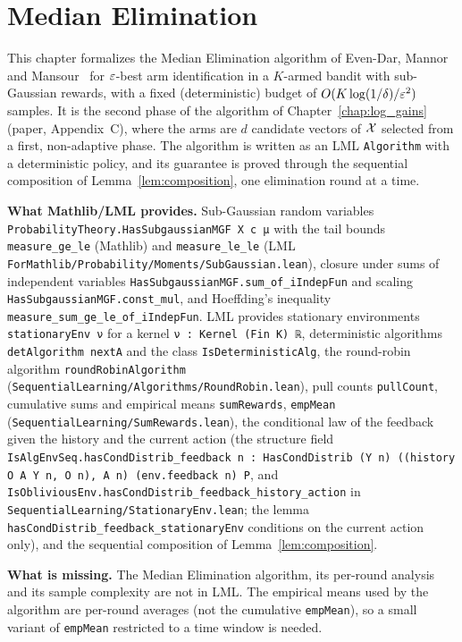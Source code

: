 \chapter{Median Elimination}
\label{chap:pre_median}

This chapter formalizes the Median Elimination algorithm of Even-Dar, Mannor and
Mansour~\cite{even2002pac,evendar2006action} for $\varepsilon$-best arm identification in a
$K$-armed bandit with sub-Gaussian rewards, with a fixed (deterministic) budget of
$O(K\log(1/\delta)/\varepsilon^2)$ samples. It is the second phase of the algorithm of
Chapter~\ref{chap:log_gains} (paper, Appendix~C), where the arms are $d$ candidate vectors of
$\mathcal{X}$ selected from a first, non-adaptive phase. The algorithm is written as an LML
\texttt{Algorithm} with a deterministic policy, and its guarantee is proved through the
sequential composition of Lemma~\ref{lem:composition}, one elimination round at a time.

\textbf{What Mathlib/LML provides.} Sub-Gaussian random variables
\texttt{ProbabilityTheory.HasSubgaussianMGF X c μ} with the tail bounds \texttt{measure\_ge\_le}
(Mathlib) and \texttt{measure\_le\_le} (LML \texttt{ForMathlib/Probability/Moments/SubGaussian.lean}),
closure under sums of independent variables \texttt{HasSubgaussianMGF.sum\_of\_iIndepFun} and scaling
\texttt{HasSubgaussianMGF.const\_mul}, and Hoeffding's inequality
\texttt{measure\_sum\_ge\_le\_of\_iIndepFun}. LML provides stationary environments
\texttt{stationaryEnv ν} for a kernel \texttt{ν : Kernel (Fin K) ℝ}, deterministic algorithms
\texttt{detAlgorithm nextA} and the class \texttt{IsDeterministicAlg}, the round-robin
algorithm \texttt{roundRobinAlgorithm} (\texttt{SequentialLearning/Algorithms/RoundRobin.lean}),
pull counts \texttt{pullCount}, cumulative sums and empirical means \texttt{sumRewards},
\texttt{empMean} (\texttt{SequentialLearning/SumRewards.lean}), the conditional law of the
feedback given the history and the current action (the structure field
\texttt{IsAlgEnvSeq.hasCondDistrib\_feedback n : HasCondDistrib (Y n) ((history O A Y n, O n), A n) (env.feedback n) P},
and \texttt{IsObliviousEnv.hasCondDistrib\_feedback\_history\_action} in
\texttt{SequentialLearning/StationaryEnv.lean}; the lemma
\texttt{hasCondDistrib\_feedback\_stationaryEnv} conditions on the current action only), and
the sequential composition of Lemma~\ref{lem:composition}.

\textbf{What is missing.} The Median Elimination algorithm, its per-round analysis and its
sample complexity are not in LML. The empirical means used by the algorithm are per-round
averages (not the cumulative \texttt{empMean}), so a small variant of \texttt{empMean}
restricted to a time window is needed.

